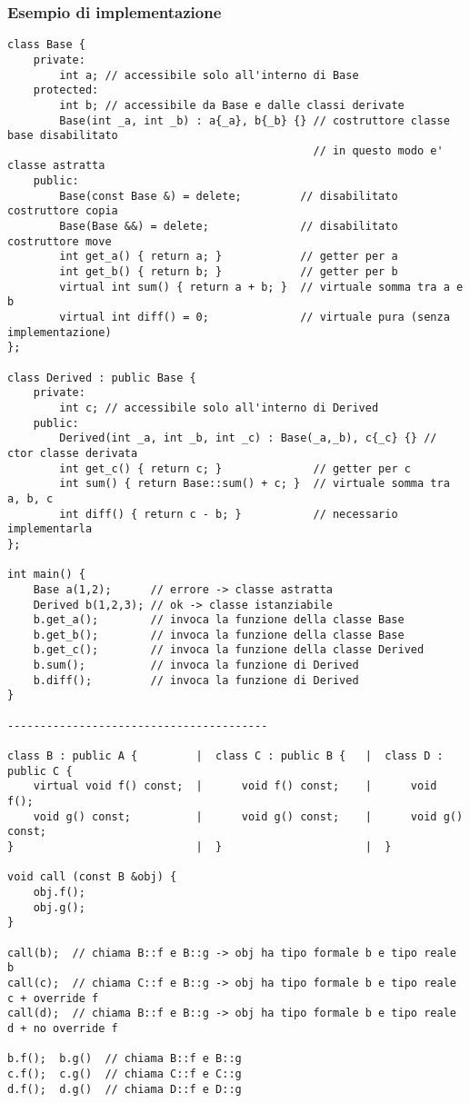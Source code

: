 \documentclass[a4paper]{article}
\begin{document}
\subsubsection*{Esempio di implementazione}
\begin{lstlisting}
class Base {
	private:
		int a; // accessibile solo all'interno di Base
	protected:
		int b; // accessibile da Base e dalle classi derivate
		Base(int _a, int _b) : a{_a}, b{_b} {} // costruttore classe base disabilitato
		                                       // in questo modo e' classe astratta
	public:
		Base(const Base &) = delete;         // disabilitato costruttore copia
		Base(Base &&) = delete;              // disabilitato costruttore move
		int get_a() { return a; }            // getter per a
		int get_b() { return b; }            // getter per b
		virtual int sum() { return a + b; }  // virtuale somma tra a e b
		virtual int diff() = 0;              // virtuale pura (senza implementazione)
};

class Derived : public Base {
	private:
		int c; // accessibile solo all'interno di Derived
	public:
		Derived(int _a, int _b, int _c) : Base(_a,_b), c{_c} {} // ctor classe derivata
		int get_c() { return c; }              // getter per c  
		int sum() { return Base::sum() + c; }  // virtuale somma tra a, b, c
		int diff() { return c - b; }           // necessario implementarla
};

int main() {
	Base a(1,2);      // errore -> classe astratta
	Derived b(1,2,3); // ok -> classe istanziabile
	b.get_a();        // invoca la funzione della classe Base
	b.get_b();        // invoca la funzione della classe Base
	b.get_c();        // invoca la funzione della classe Derived
	b.sum();          // invoca la funzione di Derived
	b.diff();         // invoca la funzione di Derived
}

----------------------------------------

class B : public A {         |  class C : public B {   |  class D : public C {
	virtual void f() const;  |      void f() const;    |      void f();
	void g() const;          |      void g() const;    |      void g() const;
}                            |  }                      |  }

void call (const B &obj) {
	obj.f();
	obj.g();
}

call(b);  // chiama B::f e B::g -> obj ha tipo formale b e tipo reale b
call(c);  // chiama C::f e B::g -> obj ha tipo formale b e tipo reale c + override f
call(d);  // chiama B::f e B::g -> obj ha tipo formale b e tipo reale d + no override f

b.f();  b.g()  // chiama B::f e B::g
c.f();  c.g()  // chiama C::f e C::g
d.f();  d.g()  // chiama D::f e D::g
\end{lstlisting}
\end{document}
